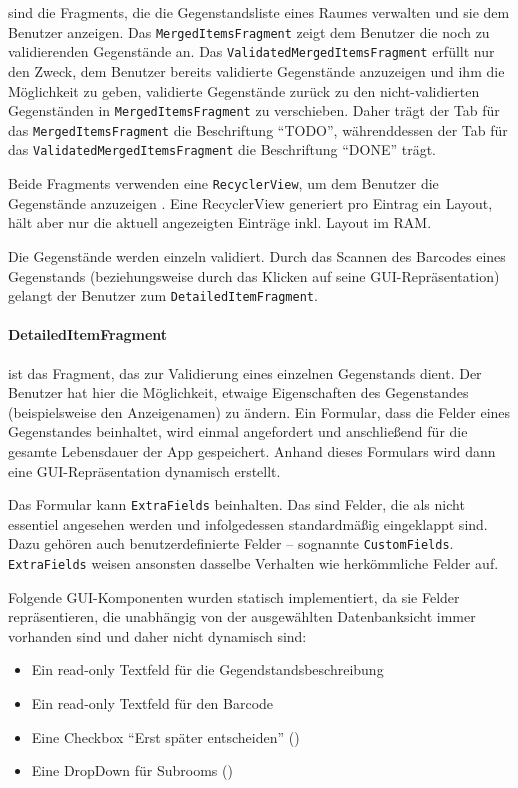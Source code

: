 sind die Fragments, die die Gegenstandsliste eines Raumes verwalten und
sie dem Benutzer anzeigen. Das \texttt{MergedItemsFragment} zeigt dem
Benutzer die noch zu validierenden Gegenstände an. Das
\texttt{ValidatedMergedItemsFragment} erfüllt nur den Zweck, dem
Benutzer bereits validierte Gegenstände anzuzeigen und ihm die
Möglichkeit zu geben, validierte Gegenstände zurück zu den
nicht-validierten Gegenständen in \texttt{MergedItemsFragment} zu
verschieben. Daher trägt der Tab für das \texttt{MergedItemsFragment}
die Beschriftung ``TODO'', währenddessen der Tab für das
\texttt{ValidatedMergedItemsFragment} die Beschriftung ``DONE'' trägt.

Beide Fragments verwenden eine \texttt{RecyclerView}, um dem Benutzer
die Gegenstände anzuzeigen \cite{recyclerview}. Eine RecyclerView
generiert pro Eintrag ein Layout, hält aber nur die aktuell angezeigten
Einträge inkl. Layout im RAM.

Die Gegenstände werden einzeln validiert. Durch das Scannen des Barcodes
eines Gegenstands (beziehungsweise durch das Klicken auf seine
GUI-Repräsentation) gelangt der Benutzer zum
\texttt{DetailedItemFragment}.

\hypertarget{detaileditemfragment}{%
\paragraph{DetailedItemFragment}\label{detaileditemfragment}}

ist das Fragment, das zur Validierung eines einzelnen Gegenstands dient.
Der Benutzer hat hier die Möglichkeit, etwaige Eigenschaften des
Gegenstandes (beispielsweise den Anzeigenamen) zu ändern. Ein Formular,
dass die Felder eines Gegenstandes beinhaltet, wird einmal angefordert
und anschließend für die gesamte Lebensdauer der App gespeichert. Anhand
dieses Formulars wird dann eine GUI-Repräsentation dynamisch erstellt.

Das Formular kann \texttt{ExtraFields} beinhalten. Das sind Felder, die
als nicht essentiel angesehen werden und infolgedessen standardmäßig
eingeklappt sind. Dazu gehören auch benutzerdefinierte Felder --
sognannte \texttt{CustomFields}. \texttt{ExtraFields} weisen ansonsten
dasselbe Verhalten wie herkömmliche Felder auf.

Folgende GUI-Komponenten wurden statisch implementiert, da sie Felder
repräsentieren, die unabhängig von der ausgewählten Datenbanksicht immer
vorhanden sind und daher nicht dynamisch sind:

\begin{itemize}
\tightlist
\item
  Ein read-only Textfeld für die Gegendstandsbeschreibung
\item
  Ein read-only Textfeld für den Barcode
\item
  Eine Checkbox ``Erst später entscheiden''
  ()
\item
  Eine DropDown für Subrooms ()
\end{itemize}

